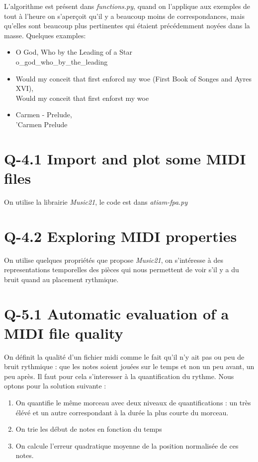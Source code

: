 \documentclass[10.5pt, oneside]{article}   	%
\begin{document}
L'algorithme est présent dans \textit{functions.py}, quand on l'applique aux exemples de tout à l'heure on s'aperçoit qu'il y a beaucoup moins de correspondances, mais qu'elles sont beaucoup plus pertinentes qui étaient précédemment noyées dans la masse. Quelques examples: \\
\begin{itemize}
	\item O God, Who by the Leading of a Star \\ o\_god\_who\_by\_the\_leading \\
	\item Would my conceit that first enforcd my woe (First Book of Songes and Ayres XVI), \\Would my conceit that first enforst my woe\\
	\item Carmen - Prelude, \\'Carmen Prelude
\end{itemize}

\section{Q-4.1 Import and plot some MIDI files}

On utilise la librairie \textit{Music21}, le code est dans \textit{atiam-fpa.py}

\section{Q-4.2 Exploring MIDI properties}

On utilise quelques propriétés que propose \textit{Music21}, on s'intéresse à des representations temporelles des pièces qui nous permettent de voir s'il y a du bruit quand au placement rythmique.

\section{Q-5.1 Automatic evaluation of a MIDI file quality}

On définit la qualité d'un fichier midi comme le fait qu'il n'y ait pas ou peu de bruit rythmique : que les notes soient jouées sur le temps et non un peu avant, un peu après. Il faut pour cela s'interesser à la quantification du rythme. Nous optons pour la solution suivante : 

\begin{enumerate}
	\item On quantifie le même morceau avec deux niveaux de quantifications : un très élévé et un autre correspondant à la durée la plus courte du morceau.
	\item On trie les début de notes en fonction du temps
	\item On calcule l'erreur quadratique moyenne de la position normalisée de ces notes.
\end{enumerate}
\end{document}
